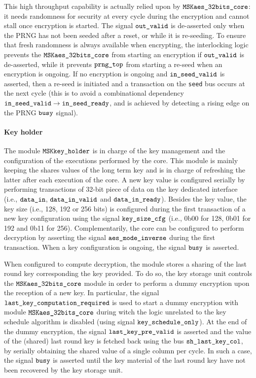 \documentclass{scrartcl}
\begin{document}
This high throughput capability is actually relied upon by $\texttt{MSKaes\_32bits\_core}$: it
needs randomness for security at every cycle during the encryption
and cannot stall once encryption is started.
The signal $\texttt{out\_valid}$ is de-asserted only when the PRNG has not been
seeded after a reset, or while it is re-seeding.
To ensure that fresh randomness is always available when encrypting, the
interlocking logic prevents the $\texttt{MSKaes\_32bits\_core}$ from starting an encryption if
$\texttt{out\_valid}$ is de-asserted, while it prevents $\texttt{prng\_top}$ from
starting a re-seed when an encryption is ongoing.
If no encryption is ongoing and $\texttt{in\_seed\_valid}$ is asserted, then a re-seed is
initiated and a transaction on the \texttt{seed} bus occurs at the next cycle
(this is to avoid a combinational dependency $\texttt{in\_seed\_valid} \rightarrow
\texttt{in\_seed\_ready}$, and is achieved by detecting a rising edge on the PRNG
$\texttt{busy}$ signal).

\paragraph{Key holder}
The module $\texttt{MSKkey\_holder}$ is in charge of the key management and the
configuration of the executions performed by the core. This module is mainly
keeping the shares values of the long term key and is in charge of refreshing
the latter after each execution of the core. A new key value is configured
serially by performing transactions of 32-bit piece of data on the key
dedicated interface (i.e., $\texttt{data\_in}$, $\texttt{data\_in\_valid}$ and
$\texttt{data\_in\_ready}$). Besides the key value, the key size (i.e., 128, 192 or
256 bits) is configured during the first transaction of a new key configuration
using the signal $\texttt{key\_size\_cfg}$ (i.e., 0b00 for 128, 0b01 for 192 and 0b11
for 256). Complementarily, the core can be configured to perform decryption by
asserting the signal $\texttt{aes\_mode\_inverse}$ during the first transaction. When a key
configuration is ongoing, the signal $\texttt{busy}$ is asserted. 

When configured to compute decryption, the module stores a sharing of the last
round key corresponding the key provided. To do so, the key storage unit
controls the $\texttt{MSKaes\_32bits\_core}$ module in order to perform a dummy encryption upon
the reception of a new key. In particular, the signal $\texttt{last\_key\_computation\_required}$ is
used to start a dummy encryption with module $\texttt{MSKaes\_32bits\_core}$ during witch the
logic unrelated to the key schedule algorithm is disabled (using signal
$\texttt{key\_schedule\_only}$). At the end of the dummy encryption, the signal
$\texttt{last\_key\_pre\_valid}$ is asserted and the value of the (shared) last
round key is fetched back using the bus $\texttt{sh\_last\_key\_col}$, by serially
obtaining the shared value of a single column per cycle. In such a case, the
signal $\texttt{busy}$ is asserted until the key material of the last round key
have not been recovered by the key storage unit. 
\end{document}
